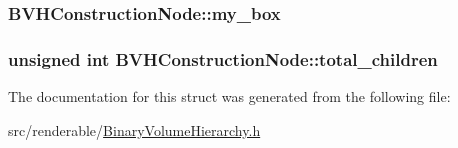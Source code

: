 \subsubsection[{\texorpdfstring{my\+\_\+box}{my_box}}]{ B\+V\+H\+Construction\+Node\+::my\+\_\+box}\hypertarget{structBVHConstructionNode_a7b016f9b43b10a37c6bbb546d8289c3e}{}\label{structBVHConstructionNode_a7b016f9b43b10a37c6bbb546d8289c3e}
\subsubsection[{\texorpdfstring{total\+\_\+children}{total_children}}]{\setlength{\rightskip}{0pt plus 5cm}unsigned int B\+V\+H\+Construction\+Node\+::total\+\_\+children}\hypertarget{structBVHConstructionNode_a368f81cc16c426723f52ae5375362d54}{}\label{structBVHConstructionNode_a368f81cc16c426723f52ae5375362d54}


The documentation for this struct was generated from the following file\+:\begin{DoxyCompactItemize}
\item 
src/renderable/\hyperlink{BinaryVolumeHierarchy_8h}{Binary\+Volume\+Hierarchy.\+h}\end{DoxyCompactItemize}
